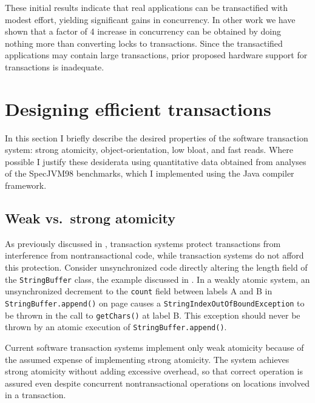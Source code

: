 \vspace*{5mm}

These initial results indicate that real applications can be
transactified with modest effort, yielding significant gains in
concurrency.  In other work \cite{AnanianAsKuLeLi05} we have shown
that a factor of 4 increase in concurrency can be obtained
by doing nothing more than converting locks to transactions.  Since
the transactified applications may contain large transactions, prior
proposed hardware support for transactions is inadequate.


\section{Designing efficient transactions}\label{sec:efficient}

In this section I briefly describe the desired properties of the
\apex software transaction system: strong atomicity,
object-orientation, low bloat, and fast reads.  Where possible I
justify these desiderata using quantitative data obtained from
analyses of the SpecJVM98 benchmarks, which I implemented using the
\flex Java compiler framework.

\subsection{Weak vs.\ strong atomicity}
As previously discussed in ,
transaction systems protect transactions from interference from
nontransactional code, while  transaction
systems do not afford this protection.
Consider unsynchronized code directly altering the length field of
the {\tt String\-Buffer} class, the example discussed in .
In a weakly atomic system, an unsynchronized decrement to the \texttt{count}
field between labels A and B in \texttt{StringBuffer.append()} on
page \pageref{pg:stringbuffer} causes a
\texttt{String\-Index\-Out\-Of\-Bound\-Exception} to be thrown in the call to
\texttt{getChars()} at label B\@.  This exception should never be thrown
by an atomic execution of {\tt String\-Buffer.append()}.

Current software transaction systems implement
only weak atomicity because of the assumed expense of implementing
strong atomicity.  The \apex system
achieves strong atomicity without adding excessive overhead, so that
correct operation is assured even despite concurrent nontransactional
operations on locations involved in a transaction.

